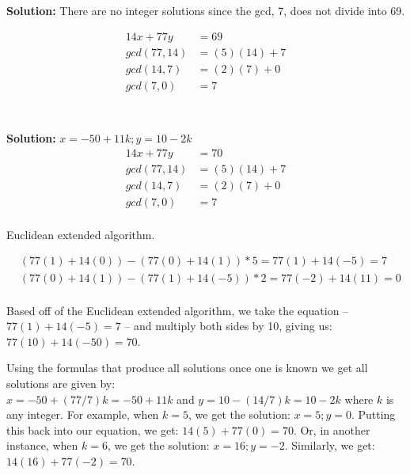 \documentclass{article}
\begin{document}
\section{}
\textbf{Solution: } There are no integer solutions since the gcd, 7, does not divide into 69.

\begin{align*}
   14x + 77y &= 69 \\
   gcd(77, 14) &= (5)(14) + 7 \\
   gcd(14, 7) &= (2)(7) + 0 \\
   gcd(7, 0) &= 7 \\
\end{align*}

\section{}

\textbf{Solution:} $x = -50 + 11k; y = 10 -2k$ \\

\begin{align*}
   14x + 77y &= 70 \\
   gcd(77, 14) &= (5)(14) + 7 \\
   gcd(14, 7) &= (2)(7) + 0 \\
   gcd(7, 0) &= 7 \\
\end{align*}

Euclidean extended algorithm.

\begin{align*}
   &(77(1) + 14(0)) - (77(0) + 14(1)) * 5 = 77(1) + 14(-5) = 7 \\
   &(77(0) + 14(1)) - (77(1) + 14(-5)) * 2 = 77(-2) + 14(11) = 0 \\
\end{align*}

Based off of the Euclidean extended algorithm, we take the equation -- $ 77(1) + 14(-5) = 7$ -- and multiply both sides by 10, giving us: $77(10) + 14(-50) = 70$. 

Using the formulas that produce all solutions once one is known we get all solutions are
given by:\\

$x = -50 + (77/7)k = -50 + 11k$ and $y = 10 - (14/7)k = 10 - 2k$ where $k$ is any integer. For example, when $k = 5$, we get the solution: $x=5; y=0$. Putting this back into our equation, we get: $14(5) + 77(0) = 70$. Or, in another instance, when $k = 6$, we get the solution: $x=16; y=-2$. Similarly, we get: $14(16) + 77(-2) = 70$.
\end{document}
